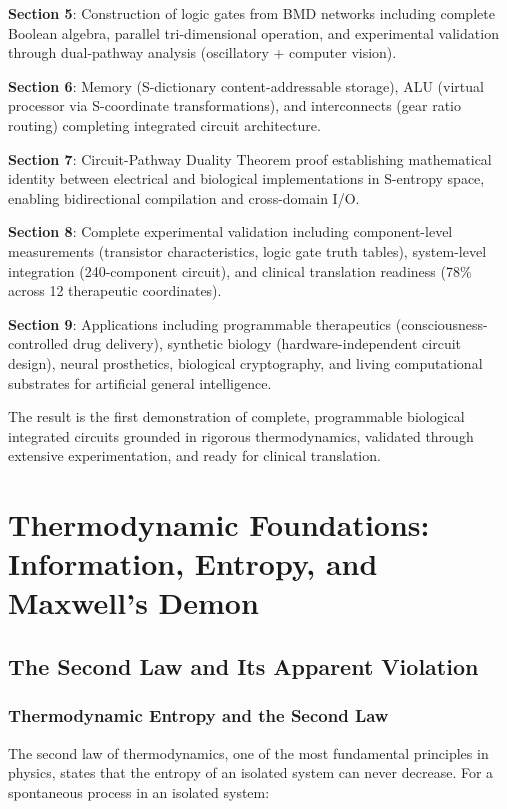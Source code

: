 \documentclass[11pt,a4paper]{article}
\begin{document}
\textbf{Section 5}: Construction of logic gates from BMD networks including complete Boolean algebra, parallel tri-dimensional operation, and experimental validation through dual-pathway analysis (oscillatory + computer vision).

\textbf{Section 6}: Memory (S-dictionary content-addressable storage), ALU (virtual processor via S-coordinate transformations), and interconnects (gear ratio routing) completing integrated circuit architecture.

\textbf{Section 7}: Circuit-Pathway Duality Theorem proof establishing mathematical identity between electrical and biological implementations in S-entropy space, enabling bidirectional compilation and cross-domain I/O.

\textbf{Section 8}: Complete experimental validation including component-level measurements (transistor characteristics, logic gate truth tables), system-level integration (240-component circuit), and clinical translation readiness (78\% across 12 therapeutic coordinates).

\textbf{Section 9}: Applications including programmable therapeutics (consciousness-controlled drug delivery), synthetic biology (hardware-independent circuit design), neural prosthetics, biological cryptography, and living computational substrates for artificial general intelligence.

The result is the first demonstration of complete, programmable biological integrated circuits grounded in rigorous thermodynamics, validated through extensive experimentation, and ready for clinical translation.

\clearpage

\section{Thermodynamic Foundations: Information, Entropy, and Maxwell's Demon}

\subsection{The Second Law and Its Apparent Violation}

\subsubsection{Thermodynamic Entropy and the Second Law}

The second law of thermodynamics, one of the most fundamental principles in physics, states that the entropy of an isolated system can never decrease\cite{callen1985thermodynamics}. For a spontaneous process in an isolated system:
\end{document}
